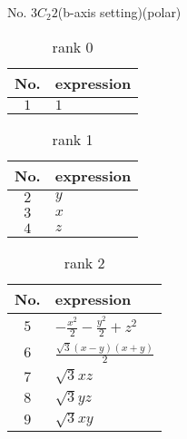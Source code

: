 \documentclass[fleqn,8pt,landscape]{jsarticle}
\begin{document}
\setcounter{MaxMatrixCols}{16}

\begin{center}
\LARGE
No. 3\quad$C_{2}$\quad$2$\quad(b-axis setting)\quad[ monoclinic ] (polar)
\end{center}
\begin{table}[ht!]
\begin{center}
\caption{rank 0}
\renewcommand{\arraystretch}{1.3}
\begin{tabular}{cl} \hline \hline
No. & expression \\ \hline
$ 1 $ & $ 1 $ \\
 \hline \hline
\end{tabular}
\end{center}
\end{table}
\begin{table}[ht!]
\begin{center}
\caption{rank 1}
\renewcommand{\arraystretch}{1.3}
\begin{tabular}{cl} \hline \hline
No. & expression \\ \hline
$ 2 $ & $ y $ \\
$ 3 $ & $ x $ \\
$ 4 $ & $ z $ \\
 \hline \hline
\end{tabular}
\end{center}
\end{table}
\begin{table}[ht!]
\begin{center}
\caption{rank 2}
\renewcommand{\arraystretch}{1.3}
\begin{tabular}{cl} \hline \hline
No. & expression \\ \hline
$ 5 $ & $ - \frac{x^{2}}{2} - \frac{y^{2}}{2} + z^{2} $ \\
$ 6 $ & $ \frac{\sqrt{3} \left(x - y\right) \left(x + y\right)}{2} $ \\
$ 7 $ & $ \sqrt{3} x z $ \\
$ 8 $ & $ \sqrt{3} y z $ \\
$ 9 $ & $ \sqrt{3} x y $ \\
 \hline \hline
\end{tabular}
\end{center}
\end{table}
\end{document}
